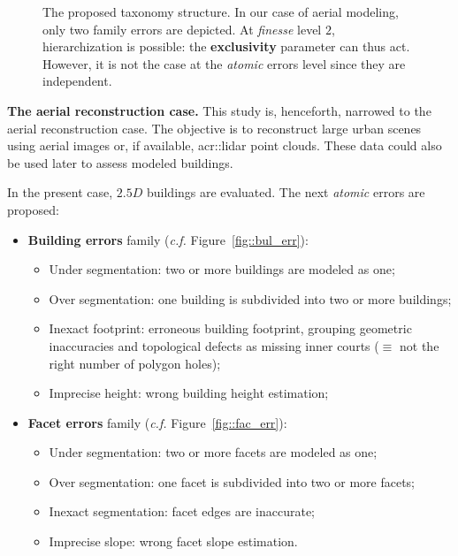 \documentclass[runningheads]{llncs}
\begin{document}
	\begin{figure}
        \begin{center}
            
            \caption{\label{fig::taxonomy} The proposed taxonomy structure. In our case of aerial modeling, only two family errors are depicted. At \textit{finesse} level $2$, hierarchization is possible: the \textbf{exclusivity} parameter can thus act. However, it is not the case at the \textit{atomic} errors level since they are independent. }
        \end{center}
    \end{figure}
\noindent
\textbf{The aerial reconstruction case.}
This study is, henceforth, narrowed to the aerial reconstruction case. The objective is to reconstruct large urban scenes using aerial images or, if available, \acrshort{acr::lidar} point clouds. These data could also be used later to assess modeled buildings.

In the present case, $2.5D$ buildings are evaluated. The next \textit{atomic} errors are proposed:
	\begin{itemize}
		\item \textbf{Building errors} family (\textit{c.f.} Figure~\ref{fig::bul_err}):
        \begin{itemize}
        	\item Under segmentation: two or more buildings are modeled as one;
            \item Over segmentation: one building is subdivided into two or more buildings;
            \item Inexact footprint: erroneous building footprint, grouping geometric inaccuracies and topological defects as missing inner courts ($\equiv$ not the right number of polygon holes);
            \item Imprecise height: wrong building height estimation;
        \end{itemize}
		\item \textbf{Facet errors} family (\textit{c.f.} Figure~\ref{fig::fac_err}):
        \begin{itemize}
        	\item Under segmentation: two or more facets are modeled as one;
            \item Over segmentation: one facet is subdivided into two or more facets;
            \item Inexact segmentation: facet edges are inaccurate;
            \item Imprecise slope: wrong facet slope estimation.
        \end{itemize}
	\end{itemize}
\end{document}
